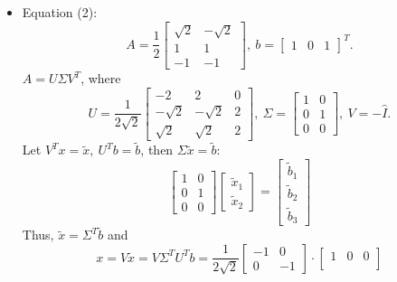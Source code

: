 \documentclass[14pt, notitlepage]{article}
\begin{document}
\begin{itemize}
    \item Equation (2):
        \[ A = \frac{1}{2} \begin{bmatrix}
            \sqrt{2} & -\sqrt{2} \\
            1 & 1 \\ 
            -1 & -1
        \end{bmatrix},\ b = \begin{bmatrix}
            1 & 0 & 1
        \end{bmatrix}^T. 
        \]
        $A = U \Sigma V^T$, where
        \[
                U = \frac{1}{2\sqrt{2}}\begin{bmatrix}
                -2 & 2 & 0 \\
                -\sqrt{2} & -\sqrt{2} & 2 \\
                \sqrt{2} & \sqrt{2} & 2
            \end{bmatrix},\ \Sigma = \begin{bmatrix}
                1 & 0 \\
                0 & 1 \\
                0 & 0
            \end{bmatrix},\ V = -\hat{I}.
        \]
        Let $V^T x = \tilde{x},\ U^T b = \tilde{b}$, then $\Sigma \tilde{x} = \tilde{b}$:
        \[
            \begin{bmatrix}
                1 & 0 \\
                0 & 1 \\
                0 & 0
            \end{bmatrix} \begin{bmatrix}
                \tilde{x}_1 \\ \tilde{x}_2
            \end{bmatrix} = \begin{bmatrix}
                \tilde{b}_1 \\ \tilde{b}_2 \\ \tilde{b}_3
            \end{bmatrix}
        \]
        Thus, $\tilde{x} = \Sigma^T \tilde{b}$ and \[
            x = V\tilde{x} = V \Sigma^T U^T b = \frac{1}{2\sqrt{2}} \begin{bmatrix}
                -1 & 0 \\
                0 & -1
            \end{bmatrix} \cdot \begin{bmatrix}
                1 & 0 & 0 \\

\end{bmatrix}\]
\end{itemize}
\end{document}
